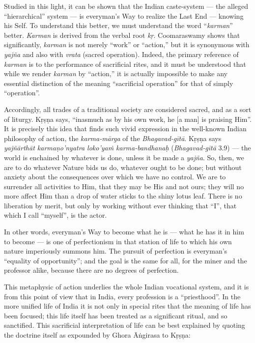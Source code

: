 Studied in this light, it can be shown that the Indian caste-system --- the alleged “hierarchical” system --- is everyman’s Way to realize the Last End --- knowing his Self. To understand this better, we must understand the word “{\sl karman}” better. {\sl Karman} is derived from the verbal root {\sl kṛ}. Coomaraswamy shows that significantly, {\sl karman} is not merely “work” or “action,” but it is synonymous with {\sl yajña} and also with {\sl vrata} (sacred operation). Indeed, the primary reference of {\sl karman} is to the performance of sacrificial rites, and it must be understood that while we render {\sl karman} by “action,” it is actually impossible to make any essential distinction of the meaning “sacrificial operation” for that of simply “operation”.

Accordingly, all trades of a traditional society are considered sacred, and as a sort of liturgy. Kṛṣṇa says, “inasmuch as by his own work, he [a man] is praising Him”. It is precisely this idea that finds such vivid expression in the well-known Indian philosophy of action, the {\sl karma-mārga} of the {\sl Bhagavad-gītā}. Kṛṣṇa says {\sl yajñārthāt karmaṇo’nyatra loko’yaṁ karma-bandhanaḥ} ({\sl Bhagavad-gītā} 3.9) --- the world is enchained by whatever is done, unless it be made a {\sl yajña}. So, then, we are to do whatever Nature bids us do, whatever ought to be done; but without anxiety about the consequences over which we have no control. We are to surrender all activities to Him, that they may be His and not ours; they will no more affect Him than a drop of water sticks to the shiny lotus leaf. There is no liberation by merit, but only by working without ever thinking that “I”, that which I call “myself”, is the actor.

In other words, everyman’s Way to become what he is --- what he has it in him to become --- is one of perfectionism in that station of life to which his own nature imperiously summons him. The pursuit of perfection is everyman’s “equality of opportunity”; and the goal is the same for all, for the miner and the professor alike, because there are no degrees of perfection. 

This metaphysic of action underlies the whole Indian vocational system, and it is from this point of view that in India, every profession is a “priesthood”. In the more unified life of India it is not only in special rites that the meaning of life has been focused; this life itself has been treated as a significant ritual, and so sanctified. This sacrificial interpretation of life can be best explained by quoting the doctrine itself as expounded by Ghora Āṅgirasa to Kṛṣṇa: 

